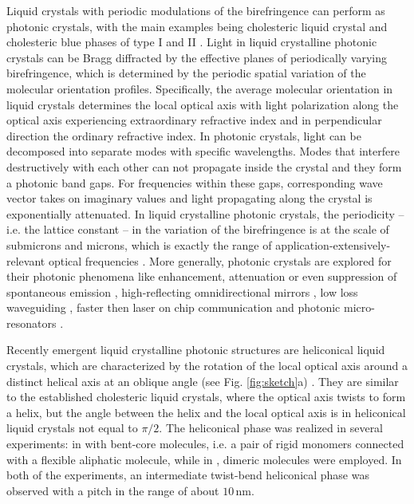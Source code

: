 \documentclass{osa-article}
\begin{document}
Liquid crystals with periodic modulations of the birefringence can perform as photonic crystals, 
with the main examples being cholesteric liquid crystal \cite{degennes} and cholesteric blue phases of type I and II \cite{ColesHJ_Nature436_2005,StimulakM_SoftMatter10_2014}.
Light in liquid crystalline photonic crystals can be Bragg diffracted by the effective planes of periodically varying birefringence,
which is determined by the periodic spatial variation of the molecular orientation profiles. 
Specifically, the average molecular orientation in liquid crystals determines the local optical axis with light polarization along the optical axis
experiencing extraordinary refractive index and in perpendicular direction the ordinary refractive index. 
In photonic crystals, light can be decomposed into separate modes with specific wavelengths. 
Modes that interfere destructively with each other can not propagate inside the crystal and they form a photonic band gaps. 
For frequencies within these gaps, corresponding wave vector takes on imaginary values and light propagating along the crystal is exponentially attenuated.
In liquid crystalline photonic crystals, the periodicity -- i.e. the lattice constant -- in the variation of the birefringence is at the scale of submicrons and microns, 
which is exactly the range of application-extensively-relevant optical frequencies \cite{JoannopoulosJD_Nature386_1997}. 
More generally, photonic crystals are explored for their photonic phenomena like enhancement, attenuation or even suppression of 
spontaneous emission \cite{NodaS_NaturePhoton1_2007,LeistikowMD_PhysRevLett107_2011}, 
high-reflecting omnidirectional mirrors \cite{YablonovitchE_PhysRevLett67_1991,RybinM_Crystals5_2015,FukudaJ_OptExpress26_2018}, 
low loss waveguiding \cite{JoannopoulosJD_Nature386_1997,PhotonicCrystalFibersPropertiesandApplications}, 
faster then laser on chip communication \cite{8012673} and photonic micro-resonators \cite{MusevicI_LiquidCrystalsReviews4_2016}.

Recently emergent liquid crystalline photonic structures are heliconical liquid crystals, which are characterized by the rotation of the local optical axis 
around a distinct helical axis at an oblique angle (see Fig. \ref{fig:sketch}a) \cite{MeyerRB_ApplPhysLett12_1968}. 
They are similar to the established cholesteric liquid crystals, where the optical axis twists to form a helix, 
but the angle between the helix and the local optical axis is in heliconical liquid crystals not equal to $\pi/2$. 
The heliconical phase was realized in several experiments: 
in \cite{BorshchV_NatCommun4_2013} with bent-core molecules, i.e. a pair of rigid monomers connected with a flexible aliphatic molecule, 
while in \cite{ChenD_PhysRevE89_2014}, dimeric molecules were employed. 
In both of the experiments, an intermediate twist-bend heliconical phase was observed with a pitch in the range of about $10 \, \mathrm{nm}$. 
\end{document}
